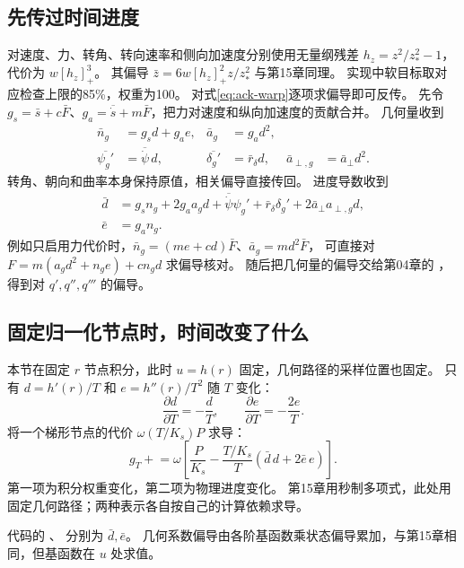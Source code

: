 \subsection{先传过时间进度}
对速度、力、转角、转向速率和侧向加速度分别使用无量纲残差
$h_z=z^2/z_*^2-1$，代价为 $w[h_z]_+^3$。
其偏导 $\bar z=6w[h_z]_+^2z/z_*^2$ 与第15章同理。
实现中软目标取对应检查上限的85\%，权重为100。
对式\eqref{eq:ack-warp}逐项求偏导即可反传。
先令
$g_s=\bar s+c\bar F$、$g_a=\overline{\dot s}+m\bar F$，把力对速度和纵向加速度的贡献合并。
几何量收到
\begin{align*}
 \bar n_g&=g_sd+g_ae,& \bar a_g&=g_ad^2,\\
 \overline{\psi_g'}&=\overline{\dot\psi}\,d,&
 \overline{\delta_g'}&=\bar r_\delta d,&
 \bar a_{\perp,g}&=\bar a_\perp d^2.
\end{align*}
转角、朝向和曲率本身保持原值，相关偏导直接传回。
进度导数收到
\begin{align}
 \bar d&=g_sn_g+2g_aa_gd+\overline{\dot\psi}\psi_g'
             +\bar r_\delta\delta_g'+2\bar a_\perp a_{\perp,g}d,\\
 \bar e&=g_an_g.
\end{align}
例如只启用力代价时，$\bar n_g=(me+cd)\bar F$、$\bar a_g=md^2\bar F$，
可直接对 $F=m(a_gd^2+n_ge)+cn_gd$ 求偏导核对。
随后把几何量的偏导交给第04章的 ，得到对 $q',q'',q'''$ 的偏导。

\subsection{固定归一化节点时，时间改变了什么}
本节在固定 $r$ 节点积分，此时 $u=h(r)$ 固定，几何路径的采样位置也固定。
只有 $d=h'(r)/T$ 和 $e=h''(r)/T^2$ 随 $T$ 变化：
\[
 \frac{\partial d}{\partial T}=-\frac dT,\qquad
 \frac{\partial e}{\partial T}=-\frac{2e}T.
\]
将一个梯形节点的代价 $\omega(T/K_s)P$ 求导：
\begin{equation}
 g_T\mathrel{+}=\omega\left[\frac{P}{K_s}
       -\frac{T/K_s}{T}(\bar d\,d+2\bar e\,e)\right].
\end{equation}
第一项为积分权重变化，第二项为物理进度变化。
第15章用秒制多项式，此处用固定几何路径；两种表示各自按自己的计算依赖求导。
\par\noindent\begin{minipage}{\linewidth}

\end{minipage}\par
代码的 、 分别为 $\bar d,\bar e$。
几何系数偏导由各阶基函数乘状态偏导累加，与第15章相同，但基函数在 $u$ 处求值。


